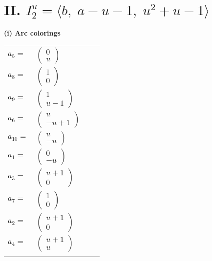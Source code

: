 \documentclass[1p]{elsarticle_modified}
\theoremstyle{definition}
\begin{document}
\centering \section*{II. $I^u_{2}= \langle b,\;a- u-1,\;u^2+u-1 \rangle$}
\flushleft \textbf{(i) Arc colorings}\\
\begin{tabular}{m{7pt} m{180pt} m{7pt} m{180pt} }
\flushright $a_{5}=$&$\begin{pmatrix}0\\u\end{pmatrix}$ \\
\flushright $a_{8}=$&$\begin{pmatrix}1\\0\end{pmatrix}$ \\
\flushright $a_{9}=$&$\begin{pmatrix}1\\u-1\end{pmatrix}$ \\
\flushright $a_{6}=$&$\begin{pmatrix}u\\- u+1\end{pmatrix}$ \\
\flushright $a_{10}=$&$\begin{pmatrix}u\\- u\end{pmatrix}$ \\
\flushright $a_{1}=$&$\begin{pmatrix}0\\- u\end{pmatrix}$ \\
\flushright $a_{3}=$&$\begin{pmatrix}u+1\\0\end{pmatrix}$ \\
\flushright $a_{7}=$&$\begin{pmatrix}1\\0\end{pmatrix}$ \\
\flushright $a_{2}=$&$\begin{pmatrix}u+1\\0\end{pmatrix}$ \\
\flushright $a_{4}=$&$\begin{pmatrix}u+1\\u\end{pmatrix}$\\&\end{tabular}
\end{document}
